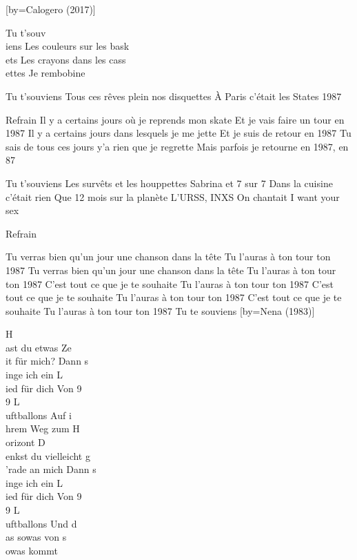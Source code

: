 [by={Calogero (2017)}]

\beginverse
Tu t'souv\\[D]iens
Les couleurs sur les bask\\[Bm]ets
Les crayons dans les cass\\[A]ettes
Je rembobine
\endverse

\beginverse
Tu t'souviens
Tous ces rêves plein nos disquettes
À Paris c'était les States
1987
\endverse

	Refrain
Il y a certains jours où je reprends mon skate
Et je vais faire un tour en 1987
Il y a certains jours dans lesquels je me jette
Et je suis de retour en 1987
Tu sais de tous ces jours y'a rien que je regrette
Mais parfois je retourne en 1987, en 87

\beginverse
Tu t'souviens
Les survêts et les houppettes
Sabrina et 7 sur 7
Dans la cuisine c'était rien
Que 12 mois sur la planète
L'URSS, INXS
On chantait I want your sex
\endverse

	Refrain

\beginverse
Tu verras bien qu'un jour une chanson dans la tête
Tu l'auras à ton tour ton 1987
Tu verras bien qu'un jour une chanson dans la tête
Tu l'auras à ton tour ton 1987
C'est tout ce que je te souhaite
Tu l'auras à ton tour ton 1987
C'est tout ce que je te souhaite
Tu l'auras à ton tour ton 1987
C'est tout ce que je te souhaite
Tu l'auras à ton tour ton 1987
Tu te souviens
\endverse
\endsong
{}[by={Nena (1983)}]

\beginverse
H\\[Ré]ast du etwas Ze\\[Mim]it für mich?
Dann s\\[Sol]inge ich ein L\\[La]ied für dich
Von 9\\[Ré]9 L\\[Mim]uftballons
Auf i\\[Sol]hrem Weg zum H\\[La]orizont
D\\[Ré]enkst du vielleicht g\\[Mim]’rade an mich
Dann s\\[Sol]inge ich ein L\\[La]ied für dich
Von 9\\[Ré]9 L\\[Mim]uftballons
Und d\\[Sol]as sowas von s\\[La]owas kommt
\endverse

